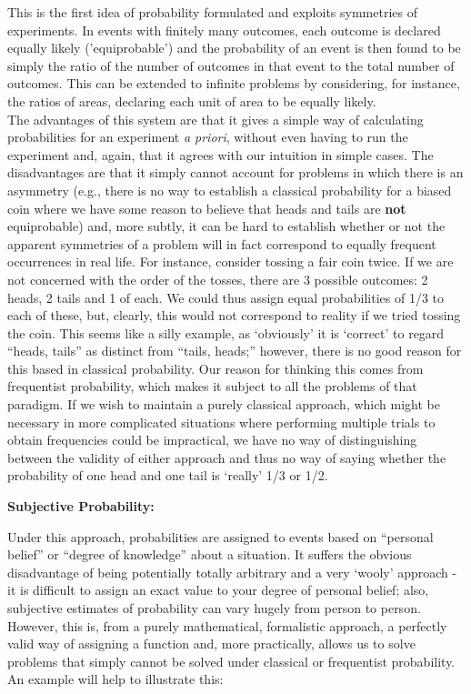 \documentclass[12pt,a4paper]{article}
\begin{document}
This is the first idea of probability formulated and exploits symmetries of experiments. In events with finitely many outcomes, each outcome is declared equally likely ('equiprobable') and the probability of an event is then found to be simply the ratio of the number of outcomes in that event to the total number of outcomes. This can be extended to infinite problems by considering, for instance, the ratios of areas, declaring each unit of area to be equally likely.\\
\indent The advantages of this system are that it gives a simple way of calculating probabilities for an experiment {\it a priori}, without even having to run the experiment and, again, that it agrees with our intuition in simple cases. The disadvantages are that it simply cannot account for problems in which there is an asymmetry (e.g., there is no way to establish a classical probability for a biased coin where we have some reason to believe that heads and tails are \textbf{not} equiprobable) and, more subtly, it can be hard to establish whether or not the apparent symmetries of a problem will in fact correspond to equally frequent occurrences in real life. For instance, consider tossing a fair coin twice. If we are not concerned with the order of the tosses, there are 3 possible outcomes: 2 heads, 2 tails and 1 of each. We could thus assign equal probabilities of 1/3 to each of these, but, clearly, this would not correspond to reality if we tried tossing the coin. This seems like a silly example, as `obviously' it is `correct' to regard ``heads, tails'' as distinct from ``tails, heads;'' however, there is no good reason for this based in classical probability. Our reason for thinking this comes from frequentist probability, which makes it subject to all the problems of that paradigm. If we wish to maintain a purely classical approach, which might be necessary in more complicated situations where performing multiple trials to obtain frequencies could be impractical, we have no way of distinguishing between the validity of either approach and thus no way of saying whether the probability of one head and one tail is `really' 1/3 or 1/2.\par
\vspace{12pt}

\noindent\textbf{Subjective Probability:}\par
\vspace{12pt}

Under this approach, probabilities are assigned to events based on ``personal belief'' or ``degree of knowledge'' about a situation. It suffers the obvious disadvantage of being potentially totally arbitrary and a very `wooly' approach - it is difficult to assign an exact value to your degree of personal belief; also, subjective estimates of probability can vary hugely from person to person. However, this is, from a purely mathematical, formalistic approach, a perfectly valid way of assigning a function and, more practically, allows us to solve problems that simply cannot be solved under classical or frequentist probability. An example will help to illustrate this:
\end{document}
